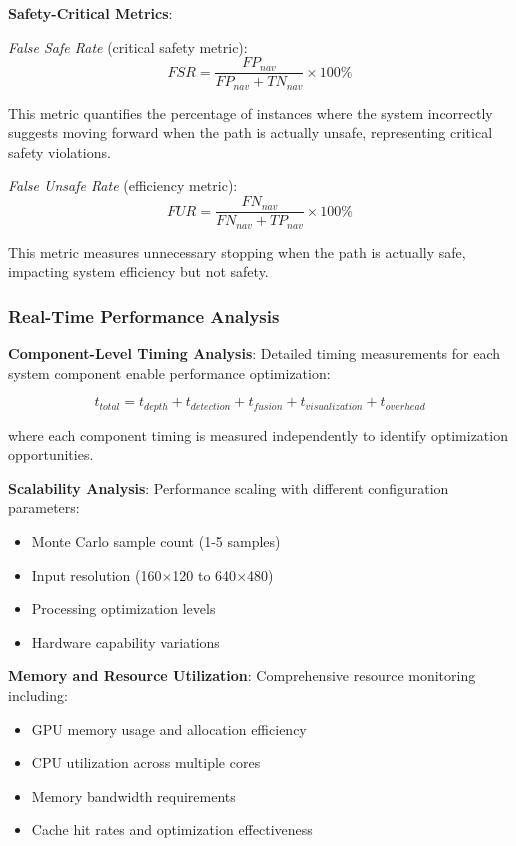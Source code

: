 \documentclass[10pt]{article}
\begin{document}
\textbf{Safety-Critical Metrics}:

\textit{False Safe Rate} (critical safety metric):
\begin{equation}
FSR = \frac{FP_{nav}}{FP_{nav} + TN_{nav}} \times 100\%
\end{equation}

This metric quantifies the percentage of instances where the system incorrectly suggests moving forward when the path is actually unsafe, representing critical safety violations.

\textit{False Unsafe Rate} (efficiency metric):
\begin{equation}
FUR = \frac{FN_{nav}}{FN_{nav} + TP_{nav}} \times 100\%
\end{equation}

This metric measures unnecessary stopping when the path is actually safe, impacting system efficiency but not safety.

\subsubsection{Real-Time Performance Analysis}

\textbf{Component-Level Timing Analysis}:
Detailed timing measurements for each system component enable performance optimization:

\begin{equation}
t_{total} = t_{depth} + t_{detection} + t_{fusion} + t_{visualization} + t_{overhead}
\end{equation}

where each component timing is measured independently to identify optimization opportunities.

\textbf{Scalability Analysis}:
Performance scaling with different configuration parameters:
\begin{itemize}
\item Monte Carlo sample count (1-5 samples)
\item Input resolution (160$\times$120 to 640$\times$480)
\item Processing optimization levels
\item Hardware capability variations
\end{itemize}

\textbf{Memory and Resource Utilization}:
Comprehensive resource monitoring including:
\begin{itemize}
\item GPU memory usage and allocation efficiency
\item CPU utilization across multiple cores
\item Memory bandwidth requirements
\item Cache hit rates and optimization effectiveness
\end{itemize}
\end{document}
